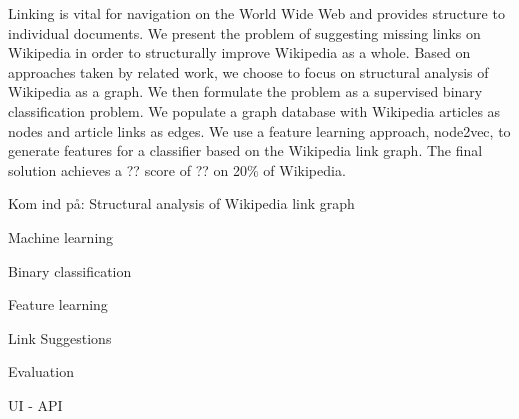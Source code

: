 Linking is vital for navigation on the World Wide Web and provides structure to individual documents. We present the problem of suggesting missing links on Wikipedia in order to structurally improve Wikipedia as a whole. Based on approaches taken by related work, we choose to focus on structural analysis of Wikipedia as a graph. We then formulate the problem as a supervised binary classification problem. We populate a graph database with Wikipedia articles as nodes and article links as edges. We use a feature learning approach, node2vec, to generate features for a classifier based on the Wikipedia link graph. The final solution achieves a ?? score of ?? on 20\% of Wikipedia.


Kom ind på:
Structural analysis of Wikipedia link graph

Machine learning

Binary classification

Feature learning

Link Suggestions

Evaluation

UI - API